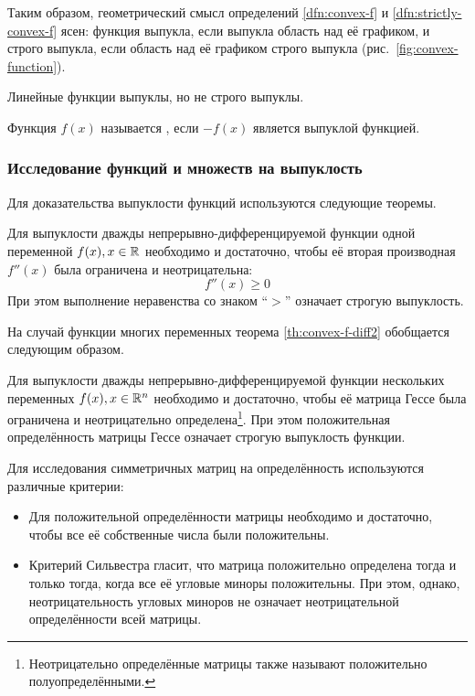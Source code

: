 Таким образом, геометрический смысл определений \ref{dfn:convex-f} и
\ref{dfn:strictly-convex-f} ясен: функция выпукла, если выпукла
область над её графиком, и строго выпукла, если область над её
графиком строго выпукла (рис. \ref{fig:convex-function}).



\begin{rem}
  \label{rem:lin-f-convex}
  Линейные функции выпуклы, но не строго выпуклы.
\end{rem}
\begin{dfn}
  \label{dfn:concave}
  Функция $f(x)$ называется , если $-f(x)$ является
  выпуклой функцией.
\end{dfn}

\subsubsection{Исследование функций и множеств на выпуклость}
\label{sec:convex-analysis}
Для доказательства выпуклости функций используются следующие теоремы.

\begin{thm}
  \label{th:convex-f-diff2}
  Для выпуклости дважды непрерывно-дифференцируемой функции одной
  переменной $f(x), x \in \mathbb{R}$ необходимо и достаточно, чтобы её
  вторая производная $f''(x)$ была ограничена и неотрицательна:
  \begin{equation*}
    f''(x) \geq 0
  \end{equation*}
  При этом выполнение неравенства со знаком {\rm``$>$''\/}\! означает
  строгую выпуклость.
\end{thm}

На случай функции многих переменных теорема \ref{th:convex-f-diff2}
обобщается следующим образом.
\begin{thm}
  \label{th:convex-f-hess}
  Для выпуклости дважды непрерывно-дифференцируемой функции нескольких
  переменных $f(x), x \in \mathbb{R}^n$ необходимо и достаточно, чтобы её
  матрица Гессе была ограничена и неотрицательно
  определена\footnote{Неотрицательно определённые матрицы также
    называют положительно полуопределёнными.}. При этом положительная
  определённость матрицы Гессе означает строгую выпуклость функции.
\end{thm}

Для исследования симметричных матриц на определённость используются
различные критерии:
\begin{itemize}
\item Для положительной определённости матрицы необходимо и
  достаточно, чтобы все её собственные числа были положительны.
\item Критерий Сильвестра гласит, что матрица положительно определена
  тогда и только тогда, когда все её угловые миноры положительны. При
  этом, однако, неотрицательность угловых миноров не означает
  неотрицательной определённости всей матрицы.
\end{itemize}


